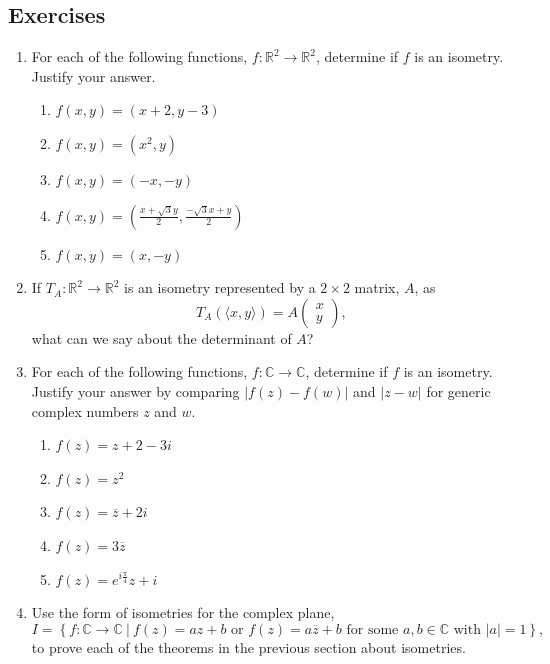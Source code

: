 \documentclass[
]{book}
\providecommand{\tightlist}{%
  \setlength{\itemsep}{0pt}\setlength{\parskip}{0pt}}
\theoremstyle{definition}
\theoremstyle{definition}
\theoremstyle{definition}
\theoremstyle{definition}
\theoremstyle{remark}
\begin{document}
\hypertarget{exercises-51}{%
\subsection{Exercises}\label{exercises-51}}

\begin{enumerate}
\def\labelenumi{\arabic{enumi}.}
\item
  For each of the following functions, \(f:\mathbb{R}^2 \rightarrow \mathbb{R}^2\), determine if \(f\) is an isometry. Justify your answer.

  \begin{enumerate}
  \def\labelenumii{\alph{enumii}.}
  \tightlist
  \item
    \(f(x,y)= (x+2,y-3)\)
  \item
    \(f(x,y)=(x^2,y)\)
  \item
    \(f(x,y)=(-x,-y)\)
  \item
    \(\displaystyle{f(x,y)=\left( \frac{x+\sqrt{3}y}{2}, \frac{-\sqrt{3}x+y}{2}\right) }\)
  \item
    \(f(x,y)=(x,-y)\)
  \end{enumerate}
\item
  If \(T_A:\mathbb{R}^2\rightarrow \mathbb{R}^2\) is an isometry represented by a \(2\times 2\) matrix, \(A\), as \[T_A\left(\langle x,y\rangle \right) = A\begin{pmatrix} x \\ y \end{pmatrix},\] what can we say about the determinant of \(A\)?
\item
  For each of the following functions, \(f:\mathbb{C} \rightarrow \mathbb{C}\), determine if \(f\) is an isometry. Justify your answer by comparing \(|f(z)-f(w)|\) and \(|z-w|\) for generic complex numbers \(z\) and \(w\).

  \begin{enumerate}
  \def\labelenumii{\alph{enumii}.}
  \tightlist
  \item
    \(f(z)=z+2-3i\)
  \item
    \(f(z)=z^2\)
  \item
    \(f(z) = \overline{z}+2i\)
  \item
    \(f(z)= 3 \overline{z}\)
  \item
    \(\displaystyle{f(z)= e^{i\frac{\pi}{4}} z +i}\)
  \end{enumerate}
\item
  Use the form of isometries for the complex plane, \[I = \left\{ f: \mathbb{C} \rightarrow \mathbb{C} \:\vert \: f(z)=a z+b \mbox{ or } f(z)=a \overline{z}+b \mbox{ for some } a, b \in \mathbb{C} \mbox{ with } |a|=1 \right\},\]
  to prove each of the theorems in the previous section about isometries.


\end{enumerate}
\end{document}
